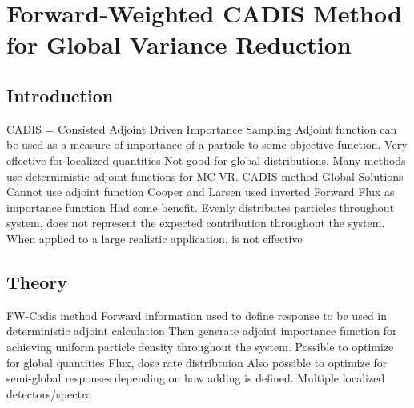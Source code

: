 \documentclass{report}
\begin{document}
\setcounter{secnumdepth}{0}
\section{Forward-Weighted CADIS Method for Global Variance Reduction}
\subsection{Introduction}
\begin{outline}
 \1 CADIS = Consisted Adjoint Driven Importance Sampling
 \1 Adjoint function can be used as a measure of importance of a particle to some objective function. 
   \2 Very effective for localized quantities
   \2 Not good for global distributions. 
 \1 Many methods use deterministic adjoint functions for MC VR. 
   \2 CADIS method
 \1 Global Solutions
   \2 Cannot use adjoint function
   \2 Cooper and Larsen used inverted Forward Flux as importance function
     \3 Had some benefit. 
     \3 Evenly distributes particles throughout system, does not represent the expected contribution throughout the system. 
       \4 When applied to a large realistic application, is not effective
\end{outline}
\subsection{Theory}
\begin{outline}
  \1 FW-Cadis method
    \2 Forward information used to define response to be used in deterministic adjoint calculation
      \3 Then generate adjoint importance function for achieving uniform particle density throughout the system. 
    \2 Possible to optimize for global quantities
      \3 Flux, dose rate distribtuion
    \2 Also possible to optimize for semi-global responses depending on how adding is defined. 
       \3 Multiple localized detectors/spectra
\end{outline}
\end{document}

